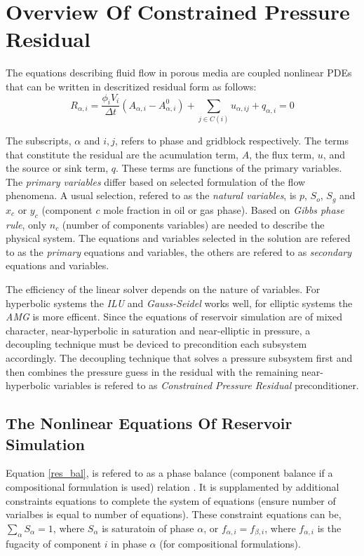 \chapter{Overview Of Constrained Pressure Residual}

The equations describing fluid flow in porous media are coupled nonlinear PDEs that can be written in descritized
residual form as follows\supercite{opmflow}:
\begin{equation}
	R_{\alpha,i} = \frac{\phi_{i}V_{i}}{\Delta t} (A_{\alpha,i} - A^{0}_{\alpha,i}) + \sum_{j\in C(i)} u_{\alpha,ij} + q_{\alpha,i} = 0
	\label{res_bal}
\end{equation}

The subscripts, $\alpha$ and $i, j$, refers to phase and gridblock respectively. The terms that 
constitute the residual are the acumulation term, $A$, the flux term, $u$, and the source or sink term,
$q$. These terms are functions of the primary variables. The \textit{primary variables} differ based on 
selected formulation of the flow phenomena. A usual selection, refered to as the \textit{natural variables}, is
$p$, $S_{o}$, $S_{g}$ and $x_{c}$ or $y_{c}$ (component $c$ mole fraction in oil or gas phase). Based on \textit{Gibbs phase rule}, 
only $n_{c}$ (number of components variables) are needed to describe the physical system\supercite{cao}. The equations and variables selected
in the solution are refered to as the \textit{primary} equations and variables, the others are refered to as \textit{secondary} equations and variables. 

The efficiency of the linear solver depends on the nature of variables. For hyperbolic systems the \textit{ILU} and \textit{Gauss-Seidel} works well, for
elliptic systems the \textit{AMG} is more efficent. Since the equations of reservoir simulation are of mixed character, near-hyperbolic in saturation and
near-elliptic in pressure, a decoupling technique must be deviced to precondition each subsystem accordingly. The decoupling technique that solves a pressure
subsystem first and then combines the pressure guess in the residual with the remaining near-hyperbolic variables is refered to as \textit{Constrained Pressure Residual} preconditioner.

\section{The Nonlinear Equations Of Reservoir Simulation}

Equation \ref{res_bal}, is refered to as a phase balance (component balance if a compositional formulation is used) relation . It is supplamented by
additional constraints equations to complete the system of equations (ensure number of varialbes is equal to number of equations). These constraint
equations can be, $\sum_{\alpha}S_{\alpha} = 1$, where  $S_{\alpha}$ is saturatoin of phase $\alpha$, or $f_{\alpha,i} = f_{\beta,i}$, where $f_{\alpha,i}$
is the fugacity of component $i$ in phase $\alpha$ (for compositional formulations). 

